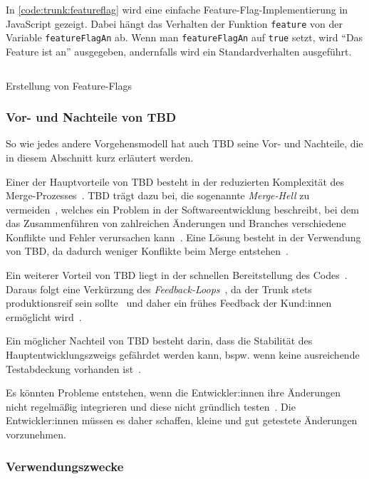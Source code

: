In \autoref{code:trunk:featureflag} wird eine  einfache Feature\hyp Flag\hyp Implementierung in JavaScript gezeigt. Dabei hängt das Verhalten der Funktion \texttt{feature} von der Variable \texttt{featureFlagAn} ab. Wenn man \texttt{featureFlagAn} auf \texttt{true} setzt, wird \enquote{Das Feature ist an} ausgegeben, andernfalls wird ein Standardverhalten ausgeführt.

\begin{listing}
    \inputminted[breaklines]{js}{src/assets/code/trunk/featureflags.js}
    \caption{Erstellung von Feature\hyp Flags}
    \label{code:trunk:featureflag}
\end{listing}  


\subsubsection{Vor- und Nachteile von TBD}

So wie jedes andere Vorgehensmodell hat auch TBD seine Vor- und Nachteile, die in diesem Abschnitt kurz erläutert werden.

Einer der Hauptvorteile von TBD besteht in der reduzierten Komplexität des Merge\hyp Prozesses~\cite{trunkbased2}. TBD trägt dazu bei, die sogenannte \emph{Merge\hyp Hell} zu vermeiden~\cite{trunkbased2}, welches ein Problem in der Softwareentwicklung beschreibt, bei dem das Zusammenführen von zahlreichen Änderungen und Branches verschiedene Konflikte und Fehler verursachen kann~\cite{trunkbased8}. Eine Lösung besteht in der Verwendung von TBD, da dadurch weniger Konflikte beim Merge entstehen~\cite{trunkbased1}.

Ein weiterer Vorteil von TBD liegt in der schnellen Bereitstellung des Codes~\cite{trunkbased8}. Daraus folgt eine Verkürzung des \emph{Feedback\hyp Loops}~\cite{trunkbased2}, da der Trunk stets produktionsreif sein sollte~\cite{trunkbased1} und daher ein frühes Feedback der Kund:innen ermöglicht wird~\cite{trunkbased2}.

Ein möglicher Nachteil von TBD besteht darin, dass die Stabilität des Hauptentwicklungszweigs gefährdet werden kann, bspw. wenn keine ausreichende Testabdeckung vorhanden ist~\cite{trunkbased1}.

Es könnten Probleme entstehen, wenn die Entwickler:innen ihre Änderungen nicht regelmäßig integrieren und diese nicht gründlich testen~\cite{trunkbased1}. 
Die Entwickler:innen müssen es daher schaffen, kleine und gut getestete Änderungen vorzunehmen.


\subsubsection{Verwendungszwecke}

